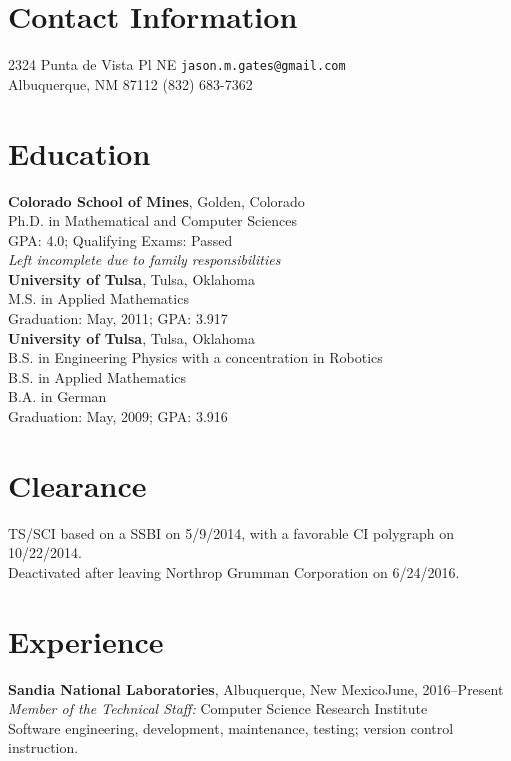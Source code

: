 \documentclass[margin,line,pifont,palatino,10pt]{res}
\begin{document}
\thispagestyle{empty}


\begin{resume}
\section{\sc Contact Information}
2324 Punta de Vista Pl NE
\hfill \texttt{\small jason.m.gates@gmail.com}\\
Albuquerque, NM 87112
\hfill (832) 683-7362

\vspace{1.5mm}
\section{\sc Education}
{\bf Colorado School of Mines}, Golden, Colorado\\
Ph.D. in Mathematical and Computer Sciences\\
GPA: 4.0; Qualifying Exams: Passed\\
{\em Left incomplete due to family responsibilities}\vspace{.1in}\\
{\bf University of Tulsa}, Tulsa, Oklahoma\\
M.S. in Applied Mathematics\\
Graduation: May, 2011; GPA: 3.917\vspace{.1in}\\
{\bf University of Tulsa}, Tulsa, Oklahoma\\
B.S. in Engineering Physics with a concentration in Robotics\\
B.S. in Applied Mathematics\\
B.A. in German\\
Graduation: May, 2009; GPA: 3.916

\vspace{1.5mm}
\section{\sc Clearance}
TS/SCI based on a SSBI on 5/9/2014, with a favorable CI polygraph on 10/22/2014.\\
Deactivated after leaving Northrop Grumman Corporation on 6/24/2016.

\vspace{1.5mm}
\section{\sc Experience}
{\bf Sandia National Laboratories}, Albuquerque, New Mexico\hfill June, 2016--Present\\
{\em Member of the Technical Staff:}  Computer Science Research Institute\\
Software engineering, development, maintenance, testing; version control instruction.


\end{resume}
\end{document}
